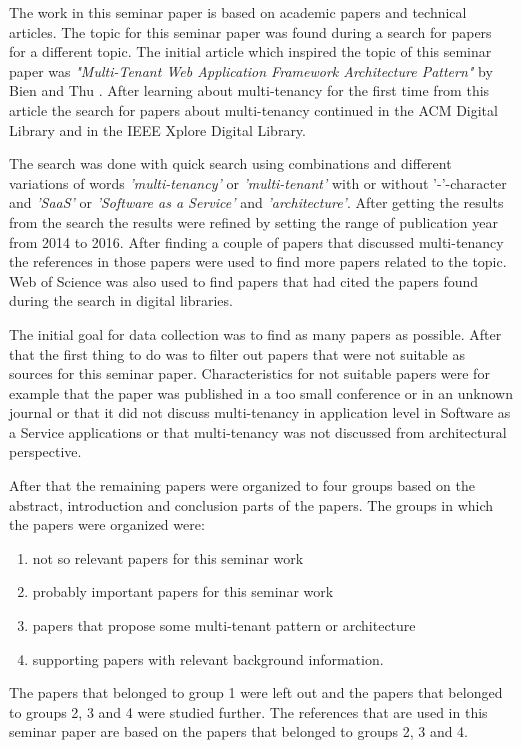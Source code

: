 \documentclass[conference]{sasmoota2017}
\begin{document}
The work in this seminar paper is based on academic papers and technical articles. The topic for this seminar paper was found during a search for papers for a different topic. The initial article which inspired the topic of this seminar paper was \textit{"Multi-Tenant Web Application Framework Architecture Pattern"} by Bien and Thu \cite{Bien:2015:MultiTenantWebApp}. After learning about multi-tenancy for the first time from this article the search for papers about multi-tenancy continued in the ACM Digital Library and in the IEEE Xplore Digital Library. 

The search was done with quick search using combinations and different variations of words \textit{'multi-tenancy'} or \textit{'multi-tenant'} with or without '-'-character and \textit{'SaaS'} or \textit{'Software as a Service'} and \textit{'architecture'}. After getting the results from the search the results were refined by setting the range of publication year from 2014 to 2016. After finding a couple of papers that discussed multi-tenancy the references in those papers were used to find more papers related to the topic. Web of Science was also used to find papers that had cited the papers found during the search in digital libraries.

The initial goal for data collection was to find as many papers as possible. After that the first thing to do was to filter out papers that were not suitable as sources for this seminar paper. Characteristics for not suitable papers were for example that the paper was published in a too small conference or in an unknown journal or that it did not discuss multi-tenancy in application level in Software as a Service applications or that multi-tenancy was not discussed from architectural perspective. 

After that the remaining papers were organized to four groups based on the abstract, introduction and conclusion parts of the papers. The groups in which the papers were organized were: 
\begin{enumerate}
\item not so relevant papers for this seminar work
\item probably important papers for this seminar work
\item papers that propose some multi-tenant pattern or architecture
\item supporting papers with relevant background information.
\end{enumerate}
The papers that belonged to group 1 were left out and the papers that belonged to groups 2, 3 and 4 were studied further. The references that are used in this seminar paper are based on the papers that belonged to groups 2, 3 and 4. 
\end{document}
